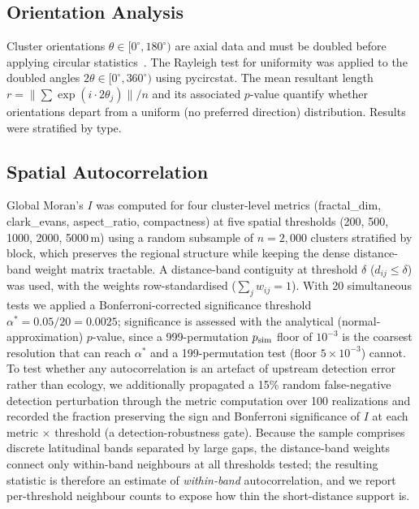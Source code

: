 \documentclass[twocolumn]{article}
\begin{document}
\subsection{Orientation Analysis}
\label{sec:orientation}

Cluster orientations $\theta \in [0^\circ, 180^\circ)$ are axial data and must be doubled before
applying circular statistics~\citep{wiegand2014handbook}. The Rayleigh test for uniformity
was applied to the doubled angles $2\theta \in [0^\circ, 360^\circ)$ using pycircstat.
The mean resultant length $r = \|\sum \exp(i \cdot 2\theta_j)\| / n$ and its associated
$p$-value quantify whether orientations depart from a uniform (no preferred direction)
distribution. Results were stratified by type.

\subsection{Spatial Autocorrelation}
\label{sec:morans}

Global Moran's $I$ was computed for four cluster-level metrics
(fractal\_dim, clark\_evans, aspect\_ratio, compactness) at five spatial thresholds
(200, 500, 1000, 2000, 5000\,m) using a random subsample of $n=2{,}000$ clusters stratified by
block, which preserves the regional structure while keeping the dense distance-band weight matrix
tractable. A distance-band contiguity at threshold $\delta$ ($d_{ij} \leq \delta$) was used, with the
weights row-standardised ($\sum_j w_{ij} = 1$). With 20 simultaneous tests we applied a
Bonferroni-corrected significance threshold $\alpha^* = 0.05/20 = 0.0025$; significance is
assessed with the analytical (normal-approximation) $p$-value, since a 999-permutation $p_{\rm sim}$
floor of $10^{-3}$ is the coarsest resolution that can reach $\alpha^*$ and a 199-permutation
test (floor $5\times10^{-3}$) cannot. To test whether any autocorrelation is an artefact of
upstream detection error rather than ecology, we additionally propagated a 15\% random
false-negative detection perturbation through the metric computation over 100 realizations and
recorded the fraction preserving the sign and Bonferroni significance of $I$ at each
metric$\,\times\,$threshold (a detection-robustness gate). Because the sample comprises discrete
latitudinal bands separated by large gaps, the distance-band weights connect only within-band
neighbours at all thresholds tested; the resulting statistic is therefore an estimate of
\emph{within-band} autocorrelation, and we report per-threshold neighbour counts to expose how
thin the short-distance support is.
\end{document}
